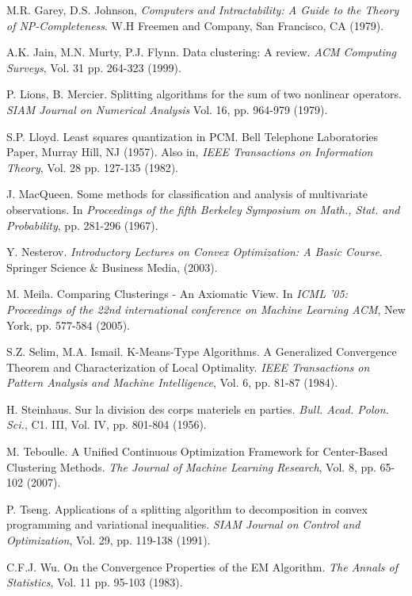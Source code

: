 \documentclass[12pt,a4paper]{report}
\begin{document}
\begin{thebibliography}{99}
 M.R. Garey, D.S. Johnson, \emph{Computers and Intractability: A Guide to the Theory of NP-Completeness}. W.H Freemen and Company, San Francisco, CA (1979).


 A.K. Jain, M.N. Murty, P.J. Flynn. Data clustering: A review. \emph{ACM Computing Surveys}, Vol. 31 pp. 264-323 (1999).


 P. Lions, B. Mercier. Splitting algorithms for the sum of two nonlinear operators. \emph{SIAM Journal on Numerical Analysis} Vol. 16, pp. 964-979 (1979).


 S.P. Lloyd. Least squares quantization in PCM. Bell Telephone Laboratories Paper, Murray Hill, NJ (1957). Also in, \emph{IEEE Transactions on Information Theory}, Vol. 28 pp. 127-135 (1982).


 J. MacQueen. Some methods for classification and analysis of multivariate observations. In \emph{Proceedings of the fifth Berkeley Symposium on Math., Stat. and Probability}, pp. 281-296 (1967).


 Y. Nesterov. \emph{Introductory Lectures on Convex Optimization: A Basic Course}. Springer Science \& Business Media, (2003).


 M. Meila. Comparing Clusterings - An Axiomatic View. In \emph{ICML '05: Proceedings of the 22nd international conference on Machine Learning ACM}, New York, pp. 577-584 (2005).


 S.Z. Selim,  M.A. Ismail. K-Means-Type Algorithms. A Generalized Convergence Theorem and Characterization of Local Optimality. \emph{IEEE Transactions on Pattern Analysis and Machine Intelligence}, Vol. 6, pp. 81-87 (1984).


 H. Steinhaus. Sur la division des corps materiels en parties. \emph{Bull. Acad. Polon. Sci.}, C1. III, Vol. IV, pp. 801-804 (1956). 


 M. Teboulle. A Unified Continuous Optimization Framework for Center-Based Clustering Methods. \emph{The Journal of Machine Learning Research}, Vol. 8, pp. 65-102 (2007).


 P. Tseng. Applications of a splitting algorithm to decomposition in convex programming and variational inequalities. \emph{SIAM Journal on Control and Optimization}, Vol. 29, pp. 119-138 (1991).


  C.F.J. Wu. On the Convergence Properties of the EM Algorithm. \emph{The Annals of Statistics}, Vol. 11 pp. 95-103 (1983).

\end{thebibliography}
\end{document}
